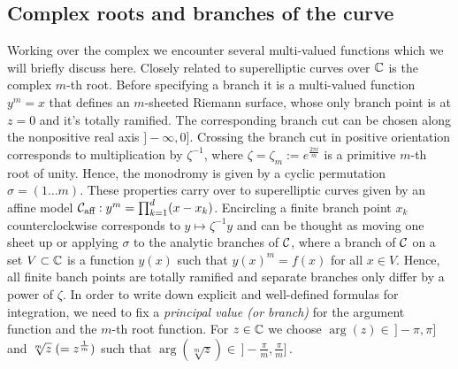 \documentclass[main.tex]{subfiles}
\begin{document}
   

  
  \subsection{Complex roots and branches of the curve}\label{subsec:roots_branches}


  Working over the complex we encounter several multi-valued functions which we will briefly discuss here.  Closely related to superelliptic curves over $\mathbb{C}$ is the complex $m$-th root. Before specifying
  a branch it is a multi-valued function $y^m = x$ that defines an $m$-sheeted Riemann surface, whose only branch point is at $z = 0$ and it's totally ramified. The corresponding branch cut can 
  be chosen
  along the nonpositive real axis $]\!-\infty,0]$. Crossing the branch cut in positive orientation corresponds to multiplication by $\zeta^{-1}$, where $\zeta = \zeta_m
  := e^{\frac{2\pi i }{m}}$ is a primitive $m$-th root of unity. Hence, the monodromy is given by a cyclic permutation $\sigma = (1 \dots m)$. \abstand
  These properties carry over to superelliptic curves given by an affine model $\mathcal{C}_{\text{aff}} : y^m = \prod_{k = 1}^d (x - x_k)$. Encircling a finite branch point $x_k$ counterclockwise corresponds
  to $y \mapsto \zeta^{-1}y$ and can be thought as moving one sheet up or applying $\sigma$ to the analytic branches of $\mathcal{C}$, where a branch of $\mathcal{C}$ on a set $V \subset \mathbb{C}$ is a function
  $y(x)$ such that $y(x)^m = f(x)$ for all $x \in V$. Hence, all finite banch points are totally ramified and separate branches only differ by a power of $\zeta$. \abstand
  In order to write down explicit and well-defined formulas for integration, we need to fix a \emph{principal value (or branch)} for the argument function and the $m$-th root function.
  For $z \in \mathbb{C}$ we choose $\arg(z) \in \,]\!\!-\pi,\pi]$ and $\sqrt[m]{z} \;( = z^{\frac{1}{m}} )$ such that $\arg(\sqrt[m]{z}) \in \, ]\!\!-\frac{\pi}{m},\frac{\pi}{m}]$\,.



 
  
\end{document}
